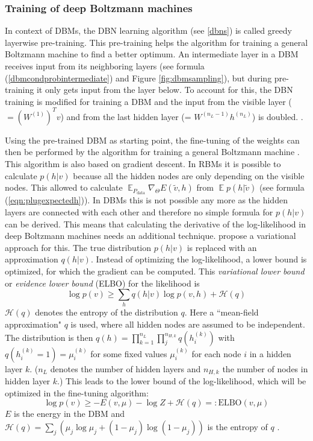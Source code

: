 \documentclass[12pt]{article}
\newcommand{\ELBO}{\mathrm{ELBO}}
\DeclareMathOperator{\EX}{\mathbb{E}}
\begin{document}
\subsubsection{Training of deep Boltzmann machines}\label{dbmtraining}


In context of DBMs, the DBN learning algorithm (see \ref{dbns}) is called greedy layerwise pre-training.
This pre-training helps the algorithm for training a general Boltzmann machine to find a better optimum.
An intermediate layer in a DBM receives input from its neighboring layers (see formula (\ref{dbmcondprobintermediate}) and Figure \ref{fig:dbmsampling}), but during pre-training it only gets input from the layer below. To account for this, the DBN training is modified for training a DBM and the input from the visible layer ($ = (W^{(1)})^T v$) and from the last hidden layer (= $W^{(n_L-1)} h^{(n_L)}$) is doubled.
\citep{salakhutdinov2009DBMs}.


Using the pre-trained DBM as starting point, the fine-tuning of the weights can then be performed by the algorithm for training a general Boltzmann machine
\citep{salakhutdinov2009DBMs, salakhutdinov2015generativemodels}.
This algorithm is also based on gradient descent.
In RBMs it is possible to calculate $p(h | v)$ because all the hidden nodes are only depending on the visible nodes.
This allowed to calculate $\EX_{P_{\text{data}}} \nabla_{\!\Theta} E(\tilde{v},h)$ from $\EX p(h | \tilde{v})$ (see formula (\ref{eqn:plugexpectedh})).
In DBMs this is not possible any more as the hidden layers are connected with each other and therefore no simple formula for $p(h | v)$ can be derived.
This means that calculating the derivative of the log-likelihood in deep Boltzmann machines needs an additional technique.
\cite{salakhutdinov2009DBMs} propose a variational approach for this.
The true distribution $p(h|v)$  is replaced with an approximation $q(h|v)$.
Instead of optimizing the log-likelihood, a lower bound is optimized, for which the gradient can be computed.
This \emph{variational lower bound} or \emph{evidence lower bound} (ELBO) \citep{blei_variational_2017} for the likelihood is
\[
\log p(v) \geq \sum_h q(h|v) \log p(v,h) + \mathcal{H}(q)
\]
$\mathcal{H}(q)$ denotes the entropy of the distribution $q$.
Here a ``mean-field approximation" $q$ is used, where all hidden nodes are assumed to be independent.
The distribution is then $q(h) = \prod_{k=1}^{n_L} \prod_j^{n_{H,k}} q(h_i^{(k)})$ with $q(h_i^{(k)} = 1) = \mu_i^{(k)}$ for some fixed values $\mu_i^{(k)}$ for each  node $i$ in a hidden layer $k$.
($n_L$ denotes the number of hidden layers and $n_{H,k}$ the number of nodes in hidden layer $k$.)
This leads to the lower bound of the log-likelihood, which will be optimized in the fine-tuning algorithm: %
\[
   \log p(v) \geq - E(v, \mu) - \log Z + \mathcal{H}(q) =: \ELBO(v, \mu)
\]
$E$ is the energy in the DBM and $\mathcal{H}(q) = \sum_j \left( \mu_j \log \mu_j + (1- \mu_j) \log ( 1- \mu_j) \right)$ is the entropy of $q$ \citep{sala2012anefficient, salakhutdinov2015generativemodels}.
\end{document}
